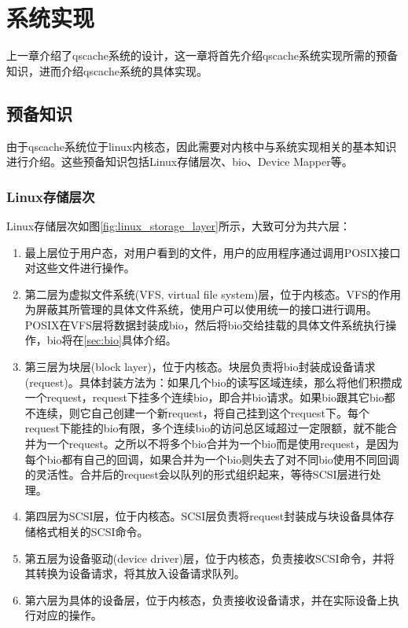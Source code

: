 
\chapter{系统实现}
\label{chap:sys_implement}

上一章介绍了qscache系统的设计，这一章将首先介绍qscache系统实现所需的预备知识，进而介绍qscache系统的具体实现。

\section{预备知识}

由于qscache系统位于linux内核态，因此需要对内核中与系统实现相关的基本知识进行介绍。这些预备知识包括Linux存储层次、bio、Device Mapper等。

\subsection{Linux存储层次}

Linux存储层次如图\ref{fig:linux_storage_layer}所示，大致可分为共六层\cite{敖青云2011存储技术原理分析}：

\begin{enumerate}
    \item 最上层位于用户态，对用户看到的文件，用户的应用程序通过调用POSIX接口对这些文件进行操作。

    \item 第二层为虚拟文件系统(VFS, virtual file system)层，位于内核态。VFS的作用为屏蔽其所管理的具体文件系统，使用户可以使用统一的接口进行调用。POSIX在VFS层将数据封装成bio，然后将bio交给挂载的具体文件系统执行操作，bio将在\ref{sec:bio}具体介绍。

    \item 第三层为块层(block layer)，位于内核态。块层负责将bio封装成设备请求(request)。具体封装方法为：如果几个bio的读写区域连续，那么将他们积攒成一个request，request下挂多个连续bio，即合并bio请求。如果bio跟其它bio都不连续，则它自己创建一个新request，将自己挂到这个request下。每个request下能挂的bio有限，多个连续bio的访问总区域超过一定限额，就不能合并为一个request。之所以不将多个bio合并为一个bio而是使用request，是因为每个bio都有自己的回调，如果合并为一个bio则失去了对不同bio使用不同回调的灵活性。合并后的request会以队列的形式组织起来，等待SCSI层进行处理。

    \item 第四层为SCSI层，位于内核态。SCSI层负责将request封装成与块设备具体存储格式相关的SCSI命令。

    \item 第五层为设备驱动(device driver)层，位于内核态，负责接收SCSI命令，并将其转换为设备请求，将其放入设备请求队列。

    \item 第六层为具体的设备层，位于内核态，负责接收设备请求，并在实际设备上执行对应的操作。

\end{enumerate}

